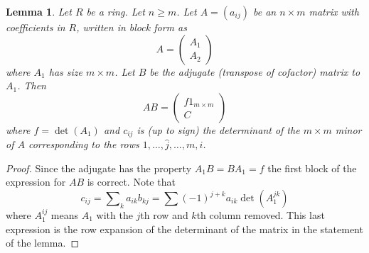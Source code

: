 \documentclass[10pt,a4paper]{amsart}
\theoremstyle{plain}
\newtheorem{lemma}[subsection]{Lemma}
\theoremstyle{definition}
\theoremstyle{remark}
\numberwithin{equation}{subsection}
\begin{document}
\begin{lemma}
\label{lemma-matrix-right-inverse}
Let $R$ be a ring. Let $n \geq m$. Let $A = (a_{ij})$ be an
$n \times m$ matrix with coefficients in $R$, written in block form
as
$$
A =
\left(
\begin{matrix}
A_1 \\
A_2
\end{matrix}
\right)
$$
where $A_1$ has size $m \times m$. Let $B$ be the adjugate (transpose of
cofactor) matrix to $A_1$. Then
$$
AB = 
\left(
\begin{matrix}
f 1_{m \times m} \\
C
\end{matrix}
\right)
$$
where $f = \det(A_1)$ and $c_{ij}$ is (up to sign) the determinant of the
$m \times m$ minor of $A$ corresponding to the rows
$1, \ldots, \hat j, \ldots, m, i$.
\end{lemma}

\begin{proof}
Since the adjugate has the property $A_1B = B A_1 = f$ the first block
of the expression for $AB$ is correct. Note that
$$
c_{ij} = \sum\nolimits_k a_{ik}b_{kj} = \sum (-1)^{j + k}a_{ik} \det(A_1^{jk})
$$
where $A_1^{ij}$ means $A_1$ with the $j$th row and $k$th column removed.
This last expression is the row expansion of the determinant of the matrix
in the statement of the lemma.
\end{proof}
\end{document}
